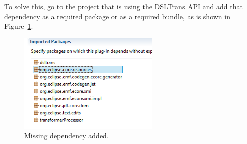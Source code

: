 To solve this, go to the project that is using the DSLTrans API and add that dependency as a required package or as a required bundle, as is shown in Figure~\ref{fig:required_package_resources}.

\begin{figure}[h]
\begin{center}
  \includegraphics[width=0.6\textwidth]{imgs/required_package_resources.png}
  \caption{Missing dependency added.}
  \label{fig:required_package_resources}
\end{center}
\end{figure}





